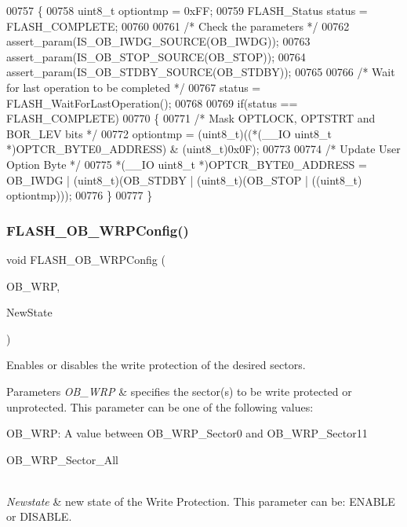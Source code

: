 \begin{DoxyCode}
00757 \{
00758   uint8\_t optiontmp = 0xFF;
00759   FLASH_Status status = FLASH_COMPLETE; 
00760 
00761   \textcolor{comment}{/* Check the parameters */}
00762   assert_param(IS_OB_IWDG_SOURCE(OB\_IWDG));
00763   assert_param(IS_OB_STOP_SOURCE(OB\_STOP));
00764   assert_param(IS_OB_STDBY_SOURCE(OB\_STDBY));
00765 
00766   \textcolor{comment}{/* Wait for last operation to be completed */}
00767   status = FLASH_WaitForLastOperation();
00768   
00769   \textcolor{keywordflow}{if}(status == FLASH_COMPLETE)
00770   \{ 
00771     \textcolor{comment}{/* Mask OPTLOCK, OPTSTRT and BOR\_LEV bits */}
00772     optiontmp =  (uint8\_t)((*(\_\_IO uint8\_t *)OPTCR_BYTE0_ADDRESS) & (uint8\_t)0x0F); 
00773 
00774     \textcolor{comment}{/* Update User Option Byte */}
00775     *(\_\_IO uint8\_t *)OPTCR\_BYTE0\_ADDRESS = OB\_IWDG | (uint8\_t)(OB\_STDBY | (uint8\_t)(OB\_STOP | ((uint8\_t)
      optiontmp))); 
00776   \}  
00777 \}
\end{DoxyCode}
\mbox{\label{group__FLASH__Group3_gaffe7e91bcce65ac079ae5afa1db568b5}} 
\subsubsection{F\+L\+A\+S\+H\+\_\+\+O\+B\+\_\+\+W\+R\+P\+Config()}
{\footnotesize\ttfamily void F\+L\+A\+S\+H\+\_\+\+O\+B\+\_\+\+W\+R\+P\+Config (\begin{DoxyParamCaption}\item[{uint32\+\_\+t}]{O\+B\+\_\+\+W\+RP,  }\item[{\textbf{ Functional\+State}}]{New\+State }\end{DoxyParamCaption})}



Enables or disables the write protection of the desired sectors. 


\begin{DoxyParams}{Parameters}
{\em O\+B\+\_\+\+W\+RP} & specifies the sector(s) to be write protected or unprotected. This parameter can be one of the following values\+: \begin{DoxyItemize}
\item O\+B\+\_\+\+W\+RP\+: A value between O\+B\+\_\+\+W\+R\+P\+\_\+\+Sector0 and O\+B\+\_\+\+W\+R\+P\+\_\+\+Sector11 \item O\+B\+\_\+\+W\+R\+P\+\_\+\+Sector\+\_\+\+All \end{DoxyItemize}
\\
\hline
{\em Newstate} & new state of the Write Protection. This parameter can be\+: E\+N\+A\+B\+LE or D\+I\+S\+A\+B\+LE. \\
\hline
\end{DoxyParams}

